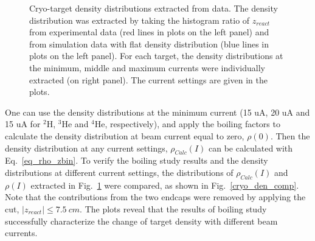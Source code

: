 \begin{figure}[!ht]
\begin{center}
{    }
    \caption[Cryo-target density distributions extracted from data]{\footnotesize{Cryo-target density distributions extracted from data. The density distribution was extracted by taking the histogram ratio of $z_{react}$ from experimental data (red lines in plots on the left panel) and from simulation data with flat density distribution (blue lines in plots on the left panel). For each target, the density distributions at the minimum, middle and maximum currents were individually extracted (on right panel). The current settings are given in the plots.}}
    \label{cryo_den_fit}
  \end{center}
\end{figure}

 One can use the density distributions at the minimum current (15 uA, 20 uA and 15 uA for $\mathrm{^{2}H}$, $\mathrm{^{3}He}$ and $\mathrm{^{4}He}$, respectively), and apply the boiling factors to calculate the density distribution at beam current equal to zero, $\rho(0)$. Then the density distribution at any current settings, $\rho_{Calc}(I)$ can be calculated with Eq.~\eqref{eq_rho_zbin}. To verify the boiling study results and the density distributions at different current settings, the distributions of $\rho_{Calc}(I)$ and $\rho(I)$ extracted in Fig.~\ref{cryo_den_fit} were compared, as shown in Fig.~\ref{cryo_den_comp}. Note that the contributions from the two endcaps were removed by applying the cut, $|z_{react}|\leq 7.5~cm$. The plots reveal that the results of boiling study successfully characterize the change of target density with different beam currents.
